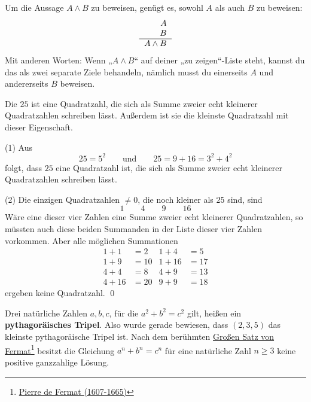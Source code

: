 \begin{axiom} \label{undbeweise}
    Um die Aussage $A\land B$ zu beweisen, genügt es, sowohl $A$ als auch $B$ zu beweisen:
    \[\begin{tabular}{r}
        $A$ \\
        $B$ \\
        \hline 
        $A\land B$
    \end{tabular} \]
    Mit anderen Worten: Wenn „$A\land B$“ auf deiner „zu zeigen“-Liste steht, kannst du das als zwei separate Ziele behandeln, nämlich musst du einerseits $A$ und andererseits $B$ beweisen.
\end{axiom}


\begin{bsp}[*]
    Die $25$ ist eine Quadratzahl, die sich als Summe zweier echt kleinerer Quadratzahlen schreiben lässt. Außerdem ist sie die kleinste Quadratzahl mit dieser Eigenschaft.
\end{bsp}


\begin{bew}
    (1) Aus
        \[ 25=5^2 \qquad\text{und}\qquad 25 = 9 + 16 = 3^2 + 4^2 \]
    folgt, dass $25$ eine Quadratzahl ist, die sich als Summe zweier echt kleinerer Quadratzahlen schreiben lässt.
    
    (2) Die einzigen Quadratzahlen $\neq 0$, die noch kleiner als $25$ sind, sind
        \[ 1\qquad 4\qquad 9\qquad 16 \]
    Wäre eine dieser vier Zahlen eine Summe zweier echt kleinerer Quadratzahlen, so müssten auch diese beiden Summanden in der Liste dieser vier Zahlen vorkommen. Aber alle möglichen Summationen
    \begin{align*}
        1+1 & = 2 & 1+4 & = 5 \\
        1+ 9 & = 10 & 1+16 & = 17 \\
        4 + 4 & = 8 & 4+9 & = 13 \\
        4+16 & = 20 & 9+9 & = 18
    \end{align*}
    ergeben keine Quadratzahl. \qed
\end{bew}


\begin{bem}[*]
    Drei natürliche Zahlen $a,b,c$, für die $a^2+b^2=c^2$ gilt, heißen ein \textbf{pythagoräisches Tripel}. Also wurde gerade bewiesen, dass $(2,3,5)$ das kleinste pythagoräische Tripel ist. Nach dem berühmten \href{https://de.wikipedia.org/wiki/Gro\%C3\%9Fer_Fermatscher_Satz}{Großen Satz von Fermat}\footnote{\href{https://de.wikipedia.org/wiki/Pierre_de_Fermat}{Pierre de Fermat (1607-1665)}} besitzt die Gleichung $a^n+b^n=c^n$ für eine natürliche Zahl $n\ge 3$ keine positive ganzzahlige Lösung.
\end{bem}


